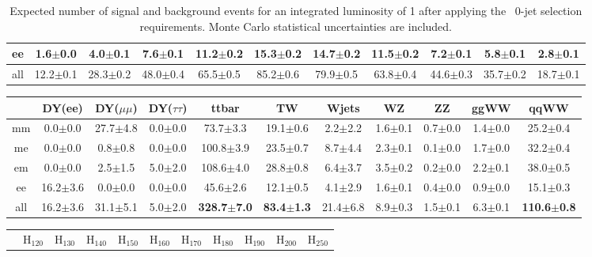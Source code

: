 \begin{table}[!ht]
\begin{center}
{\begin{tabular} {|c|c|c|c|c|c|c|c|c|c|c|}
  ee &  1.6$\pm$0.0 &  4.0$\pm$0.1 &  7.6$\pm$0.1 & 11.2$\pm$0.2 & 15.3$\pm$0.2 & 14.7$\pm$0.2 & 11.5$\pm$0.2 &  7.2$\pm$0.1 &  5.8$\pm$0.1 &  2.8$\pm$0.1 \\
  \hline
 all & 12.2$\pm$0.1 & 28.3$\pm$0.2 & 48.0$\pm$0.4 & 65.5$\pm$0.5 & 85.2$\pm$0.6 & 79.9$\pm$0.5 & 63.8$\pm$0.4 & 44.6$\pm$0.3 & 35.7$\pm$0.2 & 18.7$\pm$0.1 \\
 \hline
  \end{tabular}
  }
  \caption{Expected number of signal and background events for an 
  integrated luminosity of 1\ifb{} after 
  applying the \ww\ 0-jet selection requirements. Monte Carlo statistical uncertainties are 
  included.}
   \label{tab:wwselection0}
  \end{center}
\end{table}

\begin{table}[!ht]
  \begin{center}
 {\small
  \begin{tabular} {|c|c|c|c|c|c|c|c|c|c|c|}
\hline
  & DY(ee) & DY($\mu\mu$) & DY($\tau\tau$) & ttbar & TW & Wjets & WZ & ZZ & ggWW & qqWW \\
  \hline
  \hline
  mm &  0.0$\pm$0.0 & 27.7$\pm$4.8 &  0.0$\pm$0.0 & 73.7$\pm$3.3 & 19.1$\pm$0.6 &  2.2$\pm$2.2 &  1.6$\pm$0.1 &  0.7$\pm$0.0 &  1.4$\pm$0.0 & 25.2$\pm$0.4 \\
  me &  0.0$\pm$0.0 &  0.8$\pm$0.8 &  0.0$\pm$0.0 & 100.8$\pm$3.9 & 23.5$\pm$0.7 &  8.7$\pm$4.4 &  2.3$\pm$0.1 &  0.1$\pm$0.0 &  1.7$\pm$0.0 & 32.2$\pm$0.4 \\
  em &  0.0$\pm$0.0 &  2.5$\pm$1.5 &  5.0$\pm$2.0 & 108.6$\pm$4.0 & 28.8$\pm$0.8 &  6.4$\pm$3.7 &  3.5$\pm$0.2 &  0.2$\pm$0.0 &  2.2$\pm$0.1 & 38.0$\pm$0.5 \\
  ee & 16.2$\pm$3.6 &  0.0$\pm$0.0 &  0.0$\pm$0.0 & 45.6$\pm$2.6 & 12.1$\pm$0.5 &  4.1$\pm$2.9 &  1.6$\pm$0.1 &  0.4$\pm$0.0 &  0.9$\pm$0.0 & 15.1$\pm$0.3 \\
 \hline
 all & 16.2$\pm$3.6 & 31.1$\pm$5.1 &  5.0$\pm$2.0 & {\bf 328.7$\pm$7.0} & {\bf83.4$\pm$1.3} & 21.4$\pm$6.8 &  8.9$\pm$0.3 &  1.5$\pm$0.1 &  6.3$\pm$0.1 & {\bf 110.6$\pm$0.8} \\
 \hline
  \end{tabular}
  }
 {\small
  \begin{tabular} {|c|c|c|c|c|c|c|c|c|c|c|}
  \hline
     &   H$_{120}$ &  H$_{130}$ &    H$_{140}$ &   H$_{150}$ &   H$_{160}$ &   H$_{170}$ &   H$_{180}$ &   H$_{190}$ &   H$_{200}$ &   H$_{250}$ \\

\end{tabular}}
\end{center}
\end{table}
